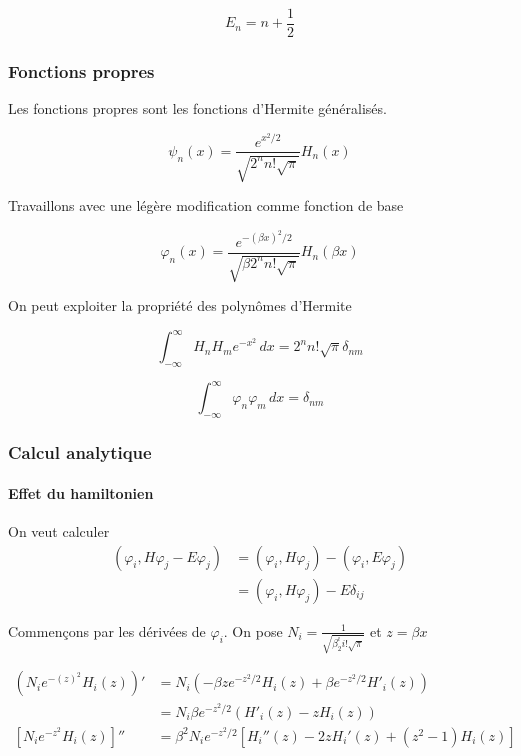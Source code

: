\documentclass[11pt]{article}
\begin{document}
\[
E_{n}=n+\frac{1}{2}
\]

\hypertarget{fonctions-propres}{%
\subsubsection{Fonctions propres}\label{fonctions-propres}}

Les fonctions propres sont les fonctions d'Hermite généralisés.

\[
\psi_{n}(x)= \frac{e^{x^{2}/2}}{\sqrt{2^{n}n!\sqrt{ \pi }  }}H_{n}(x)
\]

Travaillons avec une légère modification comme fonction de base

\[
\varphi_{n}(x)= \frac{e^{-(\beta x)^{2}/2}}{\sqrt{\beta2^{n}n!\sqrt{ \pi }  }}H_{n}(\beta x)
\]

On peut exploiter la propriété des polynômes d'Hermite

\[
\int_{-\infty}^{\infty} H_{n}H_{m} e^{-x^{2}} \, dx = 2^{n}n!\sqrt{ \pi }\delta_{nm} 
\]

\[
\int_{-\infty}^{\infty} \varphi_{n}\varphi_{m} \, dx= \delta_{nm} 
\]

\hypertarget{calcul-analytique}{%
\subsubsection{Calcul analytique}\label{calcul-analytique}}

\hypertarget{effet-du-hamiltonien}{%
\paragraph{Effet du hamiltonien}\label{effet-du-hamiltonien}}

On veut calculer \[
\begin{aligned}
(\varphi_{i},H\varphi_{j}-E\varphi_{j})  & =(\varphi_{i},H\varphi_{j})-(\varphi_{i},E\varphi_{j}) \\
 & =(\varphi_{i},H\varphi_{j})-E\delta _{ij}
\end{aligned}
\]

Commençons par les dérivées de \(\varphi_{i}\). On pose
\(N_{i}=\frac{1}{\sqrt{ \beta_{2}^{i}i!\sqrt{ \pi } }}\) et
\(z = \beta x\)

\[
\begin{aligned}
(N_{i}e^{-(z)^{2}}H_{i}(z))' & = N_{i}(-\beta ze^{-z^{2}/2}H_{i}(z)+\beta e^{-z^{2}/2}H'_{i}(z)) \\
 & =N_{i}\beta e^{-z^{2}/2}(H'_{i}(z)-zH_{i}(z)) \\
\left[N_{i}e^{-z^{2}}H_{i}(z)\right]'' & = \beta^{2}N_{i}​e^{−z^{2}/2}\left[H_{i}''​(z)−2zH_{i}'​(z)+(z^{2}−1)H_{i}​(z)\right]
\end{aligned}
\]
\end{document}
